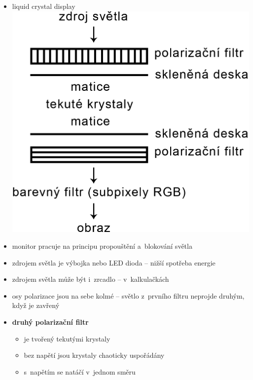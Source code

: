 \documentclass[a4paper,12pt]{article}
\providecommand{\tightlist}{%
\setlength{\itemsep}{0pt}\setlength{\parskip}{0pt}}
\begin{document}
\begin{itemize}
  \tightlist
  \item liquid crystal display
  \includegraphics{ref/lcd.png}
  \item monitor pracuje na principu propouštění a~blokování světla
  \item zdrojem světla je výbojka nebo LED dioda -- nižší spotřeba energie
  \item zdrojem světla může být i~zrcadlo -- v~kalkulačkách
  \item osy polarizace jsou na sebe kolmé -- světlo z~prvního filtru neprojde
  druhým, když je zavřený
  \item \textbf{druhý polarizační filtr}
  \begin{itemize}
    \tightlist
    \item je tvořený tekutými krystaly
    \item bez napětí jsou krystaly chaoticky uspořádány
    \item s~napětím se natáčí v~jednom směru
  \end{itemize}


\end{itemize}
\end{document}
